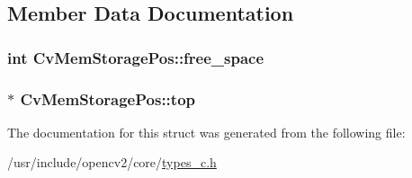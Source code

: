 \subsection{Member Data Documentation}
\hypertarget{structCvMemStoragePos_adcef7e0c6477fca4e2c1f418581d59ae}{
\subsubsection[{free\-\_\-space}]{\setlength{\rightskip}{0pt plus 5cm}int Cv\-Mem\-Storage\-Pos\-::free\-\_\-space}}\label{structCvMemStoragePos_adcef7e0c6477fca4e2c1f418581d59ae}
\hypertarget{structCvMemStoragePos_a5dbe929a3c285cd5d6495263ff4f8593}{
\subsubsection[{top}]{$\ast$ Cv\-Mem\-Storage\-Pos\-::top}}\label{structCvMemStoragePos_a5dbe929a3c285cd5d6495263ff4f8593}


The documentation for this struct was generated from the following file\-:\begin{DoxyCompactItemize}
\item 
/usr/include/opencv2/core/\hyperlink{core_2types__c_8h}{types\-\_\-c.\-h}\end{DoxyCompactItemize}
